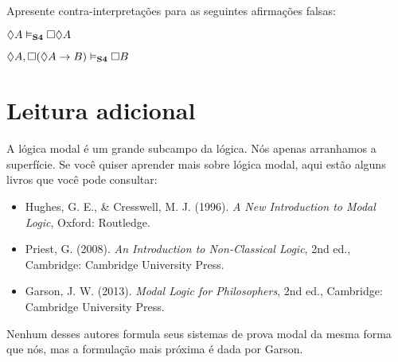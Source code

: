 \problempart
Apresente contra-interpretações para as seguintes afirmações falsas:
\begin{earg}
	\item $\Diamond A\vDash_{\mathbf{S4}} \Box\Diamond A$
	\item $\Diamond A, \Box (\Diamond A \rightarrow B)\vDash_{\mathbf{S4}}\Box B$
\end{earg}

\section*{Leitura adicional}

A lógica modal é um grande subcampo da lógica. Nós apenas arranhamos a superfície. Se você quiser aprender mais sobre lógica modal, aqui estão alguns livros que você pode consultar:

\begin{itemize}
	\item Hughes, G. E., \& Cresswell, M. J. (1996). \emph{A New Introduction to Modal Logic}, Oxford: Routledge.
	\item Priest, G. (2008). \emph{An Introduction to Non-Classical Logic}, 2nd ed., Cambridge: Cambridge University Press.
	\item Garson, J. W. (2013). \emph{Modal Logic for Philosophers}, 2nd ed., Cambridge: Cambridge University Press.
\end{itemize}

Nenhum desses autores formula seus sistemas de prova modal da mesma forma que nós, mas a formulação mais próxima é dada por Garson. 



